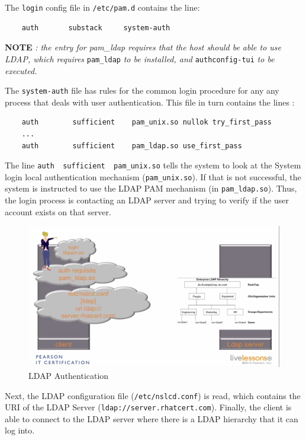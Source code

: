 \documentclass{report}
\begin{document}
	The \verb|login| config file in \verb|/etc/pam.d| contains the line:
	\vspace{-10pt}
	\begin{verbatim}
	auth       substack     system-auth
	\end{verbatim}
	
	\noindent
	\textbf{NOTE} \textit{: the entry for pam\_ldap requires that the host should be able to use LDAP, which requires} \verb|pam_ldap| \textit{to be installed, and} \verb|authconfig-tui| \textit{to be executed.}
	
	The \verb|system-auth| file has rules for the common login procedure for any any process that deals with user authentication. This file in turn contains the lines :
	
	\begin{verbatim}
	auth        sufficient    pam_unix.so nullok try_first_pass
	...
	auth        sufficient    pam_ldap.so use_first_pass
	\end{verbatim}
	
	The line \verb|auth  sufficient  pam_unix.so| tells the system to look at the System login local authentication mechanism (\verb|pam_unix.so|). If that is not successful, the system is instructed to use the LDAP PAM mechanism (in \verb|pam_ldap.so|). Thus, the login process is contacting an LDAP server and trying to verify if the user account exists on that server. 
	
	\begin{figure}[H]
		\centering
		\includegraphics[width=0.9\linewidth]{"1.6.a LDAP Authentication"}
		\caption{LDAP Authentication}
		\label{fig:1}
	\end{figure}
	
	\noindent
	Next, the LDAP configuration file (\verb|/etc/nslcd.conf|) is read, which contains the URI of the LDAP Server (\verb|ldap://server.rhatcert.com|). Finally, the client is able to connect to the LDAP server where there is a LDAP hierarchy that it can log into.  
	
\end{document}
